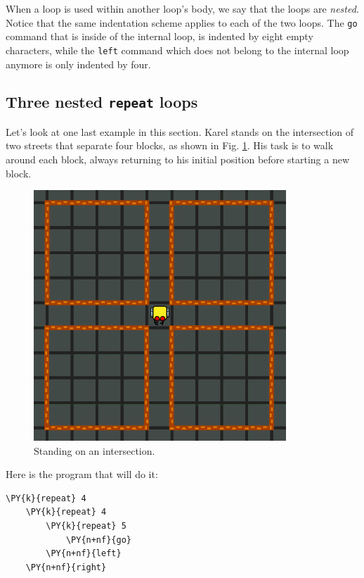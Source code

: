 \noindent
When a loop is used within another loop's body, we say that the loops are {\em nested}.
Notice that the same indentation scheme applies to each of the two loops. The {\tt go}
command that is inside of the internal loop, is indented by eight empty characters, while 
the {\tt left} command which does not belong to the internal loop anymore is only indented 
by four.  

\subsection{Three nested {\tt repeat} loops}

Let's look at one last example in this section. Karel stands on the intersection of 
two streets that separate four blocks, as shown in Fig. \ref{fig:repeat-15}. His 
task is to walk around each block, always returning to his initial position before 
starting a new block. 

\newpage
\begin{figure}[!ht]
\begin{center}
\includegraphics[width=9.5cm]{img/repeat-15.png}
\vspace{-0mm}
\caption{Standing on an intersection.}
\label{fig:repeat-15}
\end{center}
\end{figure}
\noindent
Here is the program that will do it:\\

\begin{bbox}
\begin{Verbatim}[commandchars=\\\{\}]
\PY{k}{repeat} 4
    \PY{k}{repeat} 4
        \PY{k}{repeat} 5
            \PY{n+nf}{go}
        \PY{n+nf}{left}
    \PY{n+nf}{right}
\end{Verbatim}
\end{bbox}
\vspace{6mm}

